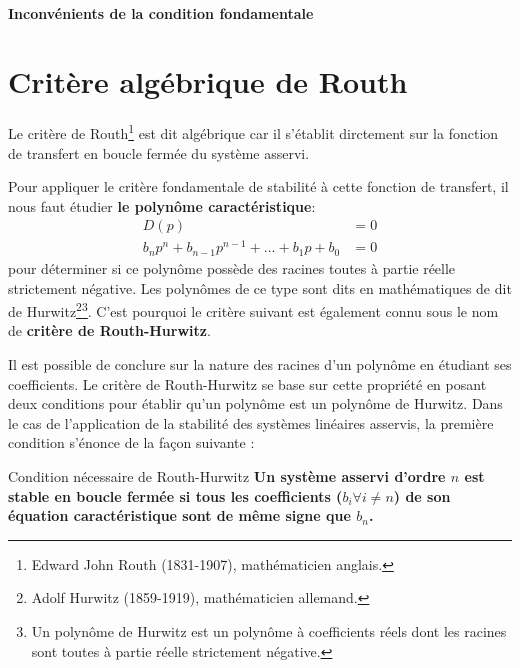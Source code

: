 \paragraph{Inconvénients de la condition fondamentale}

\section{Critère algébrique de Routh}

Le critère de Routh\footnote{Edward John Routh 
(1831-1907), mathématicien anglais.} est dit algébrique car il s'établit 
dirctement sur la fonction de transfert en boucle fermée du système asservi. 

Pour appliquer le critère fondamentale de stabilité à cette fonction de 
transfert, il nous faut étudier \textbf{le polynôme caractéristique}:
\begin{align}
    D(p)&=0 \nonumber\\
    b_np^n+b_{n-1}p^{n-1}+\ldots+b_1p+b_0 &= 0
\end{align}
pour déterminer si ce polynôme possède des racines toutes à partie réelle 
strictement négative. Les polynômes de ce type sont dits en mathématiques 
de dit de Hurwitz\footnote{Adolf Hurwitz (1859-1919), 
mathématicien allemand.}\footnote{Un polynôme de Hurwitz est un polynôme à 
coefficients réels dont les racines sont toutes à partie réelle strictement 
négative.}.
C'est pourquoi le critère suivant est également connu sous le nom de 
\textbf{critère de Routh-Hurwitz}.

Il est possible de conclure sur la nature des racines d'un polynôme 
en étudiant ses coefficients. Le critère de Routh-Hurwitz se base sur 
cette propriété en posant deux conditions pour établir qu'un polynôme est 
un polynôme de Hurwitz. Dans le cas de l'application de la stabilité des 
systèmes linéaires asservis, la première condition s'énonce 
de la façon suivante :
\begin{criteria}{Condition nécessaire de Routh-Hurwitz }
    \textbf{Un système asservi d'ordre $n$ est stable en boucle fermée 
    si tous les coefficients ($b_i\forall i\neq n$) de son équation 
    caractéristique sont de même signe que $b_n$.}
\end{criteria}

